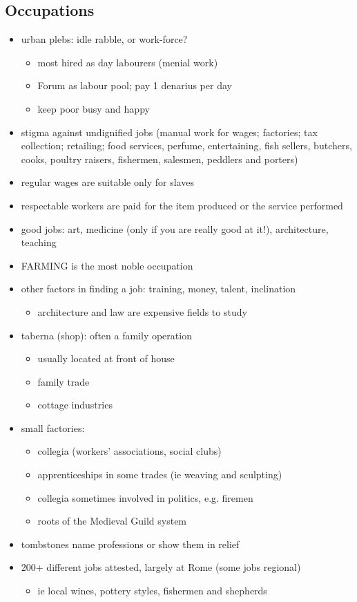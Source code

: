 \documentclass[12pt, twoside]{article}
\begin{document}
\begin{itemize}
\section{Occupations}
\begin{itemize}
\item urban plebs: idle rabble, or work-force?
	\begin{itemize}
	\item most hired as day labourers (menial work)
	\item Forum as labour pool; pay 1 denarius per day
	\item keep poor busy and happy
	\end{itemize}
\item stigma against undignified jobs (manual work for wages; factories; tax collection; retailing; food services, perfume, entertaining, fish sellers, butchers, cooks, poultry raisers, fishermen, salesmen, peddlers and porters)
\item regular wages are suitable only for slaves
\item respectable workers are paid for the item produced or the service performed
\item good jobs: art, medicine (only if you are really good at it!), architecture, teaching
\item FARMING is the most noble occupation
\item other factors in finding a job: training, money, talent, inclination
	\begin{itemize}
	\item architecture and law are expensive fields to study
	\end{itemize}
\item taberna (shop): often a family operation
	\begin{itemize}
	\item usually located at front of house
	\item family trade
	\item cottage industries
	\end{itemize}
\item small factories:
	\begin{itemize}
	\item collegia (workers' associations, social clubs)
	\item apprenticeships in some trades (ie weaving and sculpting)
	\item collegia sometimes involved in politics, e.g. firemen
	\item roots of the Medieval Guild system
	\end{itemize}
\item tombstones name professions or show them in relief
\item 200+ different jobs attested, largely at Rome (some jobs regional)
	\begin{itemize}
	\item ie local wines, pottery styles, fishermen and shepherds
	\end{itemize}
\end{itemize}


\end{itemize}
\end{document}
